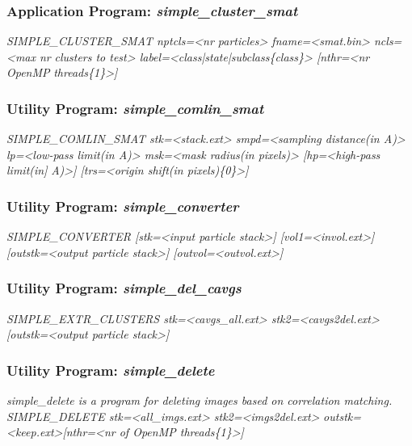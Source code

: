 \documentclass[review]{elsarticle}
\begin{document}
\subsubsection{Application Program: {\it{simple\_cluster\_smat}}}
\label{cluster_smat}
{\it{SIMPLE\_CLUSTER\_SMAT nptcls=<nr particles> fname=<smat.bin> ncls=<max nr}}
{\it{clusters to test> label=<class|state|subclass\{class\}> [nthr=<nr OpenMP}}
{\it{threads\{1\}>]}}

\subsubsection{Utility Program: {\it{simple\_comlin\_smat}}}
\label{comlin_smat}
{\it{SIMPLE\_COMLIN\_SMAT stk=<stack.ext> smpd=<sampling distance(in A)>}}
{\it{lp=<low-pass limit(in A)> msk=<mask radius(in pixels)> [hp=<high-pass limit(in}]}
{\it{A)>] [trs=<origin shift(in pixels)\{0\}>]}}

\subsubsection{Utility Program: {\it{simple\_converter}}}
\label{converter}
{\it{SIMPLE\_CONVERTER [stk=<input particle stack>] [vol1=<invol.ext>]}}
{\it{[outstk=<output particle stack>] [outvol=<outvol.ext>]}}

\subsubsection{Utility Program: {\it{simple\_del\_cavgs}}}
\label{del_cavgs}
{\it{SIMPLE\_EXTR\_CLUSTERS stk=<cavgs\_all.ext> stk2=<cavgs2del.ext>}}
{\it{[outstk=<output particle stack>]}}

\subsubsection{Utility Program: {\it{simple\_delete}}}
\label{delete}
{\it{simple\_delete} is a program for deleting images based on correlation matching.}\\
{\it{SIMPLE\_DELETE stk=<all\_imgs.ext> stk2=<imgs2del.ext>}}
{\it{outstk=<keep.ext>[nthr=<nr of OpenMP threads\{1\}>]}}
\end{document}
